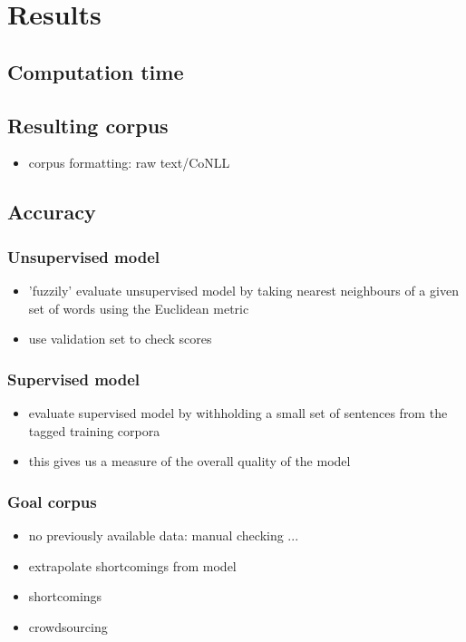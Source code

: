 
\chapter{Results}
\label{chp:interpretation}

\section{Computation time}
\label{sec:computationtime}

\section{Resulting corpus}
\label{sec:result}
\begin{itemize}
\item corpus formatting: raw text/CoNLL
\end{itemize}

\section{Accuracy}
\label{sec:accuracy}

\subsection{Unsupervised model}
\label{sec:unsupacc}
\begin{itemize}
\item 'fuzzily' evaluate unsupervised model by taking nearest neighbours of a
  given set of words using the Euclidean metric
\item use validation set to check scores
\end{itemize}

\subsection{Supervised model}
\label{sec:supacc}
\begin{itemize}
\item evaluate supervised model by withholding a small set of sentences from the tagged training corpora
\item this gives us a measure of the overall quality of the model
\end{itemize}

\subsection{Goal corpus}
\label{sec:supacc}
\begin{itemize}
\item no previously available data: manual checking ...
\item extrapolate shortcomings from model
\item shortcomings
\item crowdsourcing
\end{itemize}
